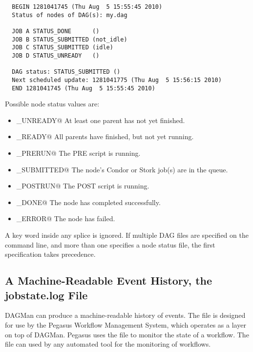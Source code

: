 \begin{verbatim}
  BEGIN 1281041745 (Thu Aug  5 15:55:45 2010)
  Status of nodes of DAG(s): my.dag

  JOB A STATUS_DONE      ()
  JOB B STATUS_SUBMITTED (not_idle)
  JOB C STATUS_SUBMITTED (idle)
  JOB D STATUS_UNREADY   ()

  DAG status: STATUS_SUBMITTED ()
  Next scheduled update: 1281041775 (Thu Aug  5 15:56:15 2010)
  END 1281041745 (Thu Aug  5 15:55:45 2010)
\end{verbatim}

Possible node status values are:

\begin{itemize}
\item \verb@STATUS_UNREADY@ At least one parent has not yet finished.
\item \verb@STATUS_READY@ All parents have finished, but not yet running.
\item \verb@STATUS_PRERUN@ The PRE script is running.
\item \verb@STATUS_SUBMITTED@ The node's Condor or Stork job(s) are in 
  the queue.
\item \verb@STATUS_POSTRUN@ The POST script is running.
\item \verb@STATUS_DONE@ The node has completed successfully.
\item \verb@STATUS_ERROR@ The node has failed.
\end{itemize}

A  key word inside any splice is ignored.
If multiple DAG files are specified on the  command line,
and more than one specifies a node status file,
the first specification takes precedence.

\subsection{\label{sec:DAGJobstateLog}A Machine-Readable Event History, the jobstate.log File}

DAGMan can produce a machine-readable history of events.
The  file is designed for use by the Pegasus Workflow
Management System, which operates as a layer on top of DAGMan.  Pegasus
uses the  file to monitor the state of a workflow.
The  file can used by any
automated tool for the monitoring of workflows.

